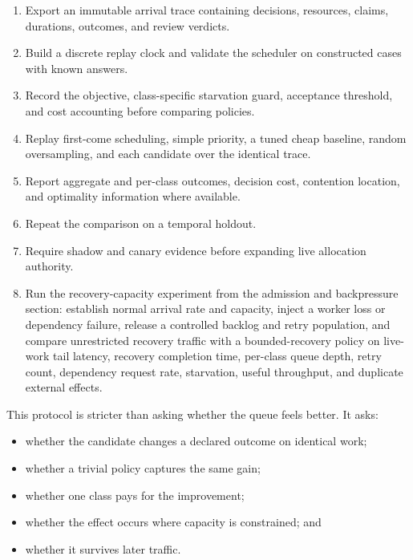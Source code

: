 \begin{enumerate}
\def\labelenumi{\arabic{enumi}.}
\tightlist
\item
  Export an immutable arrival trace containing decisions, resources, claims, durations, outcomes, and review verdicts.
\item
  Build a discrete replay clock and validate the scheduler on constructed cases with known answers.
\item
  Record the objective, class-specific starvation guard, acceptance threshold, and cost accounting before comparing policies.
\item
  Replay first-come scheduling, simple priority, a tuned cheap baseline, random oversampling, and each candidate over the identical trace.
\item
  Report aggregate and per-class outcomes, decision cost, contention location, and optimality information where available.
\item
  Repeat the comparison on a temporal holdout.
\item
  Require shadow and canary evidence before expanding live allocation authority.
\item
  Run the recovery-capacity experiment from the admission and backpressure section: establish normal arrival rate and capacity, inject a worker loss or dependency failure, release a controlled backlog and retry population, and compare unrestricted recovery traffic with a bounded-recovery policy on live-work tail latency, recovery completion time, per-class queue depth, retry count, dependency request rate, starvation, useful throughput, and duplicate external effects.
\end{enumerate}


This protocol is stricter than asking whether the queue feels better. It asks:

\begin{itemize}
\tightlist
\item
  whether the candidate changes a declared outcome on identical work;
\item
  whether a trivial policy captures the same gain;
\item
  whether one class pays for the improvement;
\item
  whether the effect occurs where capacity is constrained; and
\item
  whether it survives later traffic.
\end{itemize}

